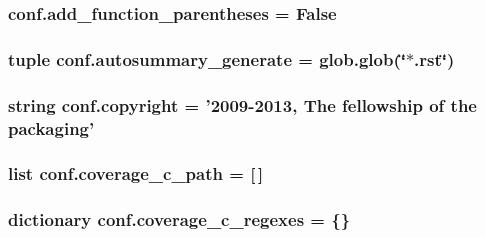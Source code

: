 \subsubsection[{add\+\_\+function\+\_\+parentheses}]{\setlength{\rightskip}{0pt plus 5cm}conf.\+add\+\_\+function\+\_\+parentheses = {\bf False}}\label{namespaceconf_a07e256fcb9def824191175f2baa72f60}
\hypertarget{namespaceconf_a790a07d2f0a86a011425cc6070929a40}{}
\subsubsection[{autosummary\+\_\+generate}]{\setlength{\rightskip}{0pt plus 5cm}tuple conf.\+autosummary\+\_\+generate = glob.\+glob(\char`\"{}$\ast$.rst\char`\"{})}\label{namespaceconf_a790a07d2f0a86a011425cc6070929a40}
\hypertarget{namespaceconf_ac8ccf456b321bc9052c0691a173b6925}{}
\subsubsection[{copyright}]{\setlength{\rightskip}{0pt plus 5cm}string conf.\+copyright = '2009-\/2013, The fellowship of the packaging'}\label{namespaceconf_ac8ccf456b321bc9052c0691a173b6925}
\hypertarget{namespaceconf_a66c4e69b1e8fef3799e172716eab9f1f}{}
\subsubsection[{coverage\+\_\+c\+\_\+path}]{\setlength{\rightskip}{0pt plus 5cm}list conf.\+coverage\+\_\+c\+\_\+path = \mbox{[}$\,$\mbox{]}}\label{namespaceconf_a66c4e69b1e8fef3799e172716eab9f1f}
\hypertarget{namespaceconf_ac5da9552acb99ae9eee8fe6ed27c726b}{}
\subsubsection[{coverage\+\_\+c\+\_\+regexes}]{\setlength{\rightskip}{0pt plus 5cm}dictionary conf.\+coverage\+\_\+c\+\_\+regexes = \{\}}\label{namespaceconf_ac5da9552acb99ae9eee8fe6ed27c726b}
\hypertarget{namespaceconf_a36727259bb25073f8a8e6a00f674c583}{}
